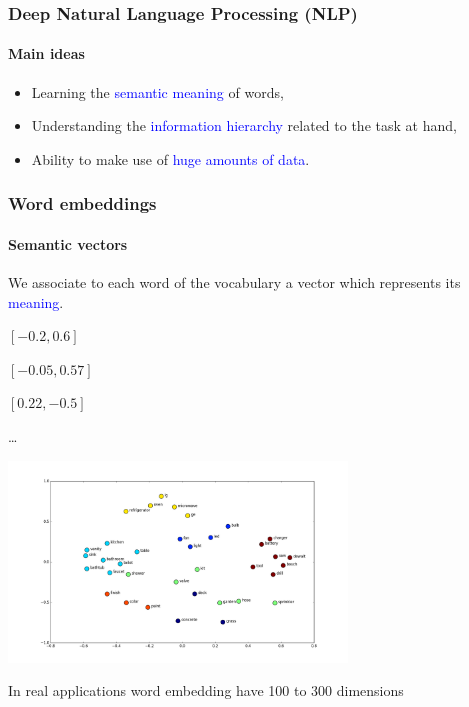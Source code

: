 \documentclass[9pt]{beamer}
\begin{document}
\begin{frame}
  \frametitle{Deep Natural Language Processing (NLP)}

  \framesubtitle{Main ideas}

  \begin{itemize}
    \item Learning the \textcolor{blue}{semantic meaning} of words,
      \pause
      \bigskip
    \item Understanding the \textcolor{blue}{information hierarchy} related to
      the task at hand,
      \bigskip
      \pause
    \item Ability to make use of \textcolor{blue}{huge amounts of data}.
  \end{itemize}
\end{frame}

\begin{frame}
  \frametitle{Word embeddings}

  \framesubtitle{Semantic vectors}

  We associate to each word of the vocabulary a vector which
  represents its \textcolor{blue}{meaning}.

  \begin{center}
    \begin{description}
      \item[Oven] $[-0.2, 0.6]$
      \item[Microwave] $[-0.05, 0.57]$
      \item[Garden] $[0.22, -0.5]$
      \item \dots
    \end{description}
  \end{center}

  \vspace{-.9cm}

  \begin{center}
    \includegraphics[width = 9cm]{images/word_embeddings_5.png}
  \end{center}

  \vspace{-0.5cm}
  In real applications word embedding have 100 to 300 dimensions
\end{frame}
\end{document}
